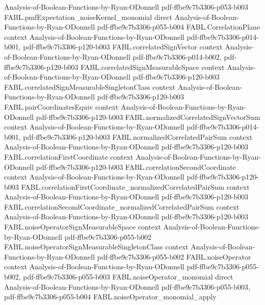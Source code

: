 \begin{theorem}
  {Analysis-of-Boolean-Functions-by-Ryan-ODonnell}
  {pdf-ffbe9c7b3306-p053-b003}
\proofstep
  {FABL.pmfExpectation_noiseKernel_monomial}
  {direct}
  {Analysis-of-Boolean-Functions-by-Ryan-ODonnell}
  {pdf-ffbe9c7b3306-p055-b004}
\proofstep
  {FABL.CorrelationPlane}
  {context}
  {Analysis-of-Boolean-Functions-by-Ryan-ODonnell}
  {pdf-ffbe9c7b3306-p014-b001,
    pdf-ffbe9c7b3306-p120-b003}
\proofstep
  {FABL.correlatedSignVector}
  {context}
  {Analysis-of-Boolean-Functions-by-Ryan-ODonnell}
  {pdf-ffbe9c7b3306-p014-b002,
    pdf-ffbe9c7b3306-p120-b003}
\proofstep
  {FABL.correlatedSignMeasurableSpace}
  {context}
  {Analysis-of-Boolean-Functions-by-Ryan-ODonnell}
  {pdf-ffbe9c7b3306-p120-b003}
\proofstep
  {FABL.correlatedSignMeasurableSingletonClass}
  {context}
  {Analysis-of-Boolean-Functions-by-Ryan-ODonnell}
  {pdf-ffbe9c7b3306-p120-b003}
\proofstep
  {FABL.pairCoordinatesEquiv}
  {context}
  {Analysis-of-Boolean-Functions-by-Ryan-ODonnell}
  {pdf-ffbe9c7b3306-p120-b003}
\proofstep
  {FABL.normalizedCorrelatedSignVectorSum}
  {context}
  {Analysis-of-Boolean-Functions-by-Ryan-ODonnell}
  {pdf-ffbe9c7b3306-p014-b001,
    pdf-ffbe9c7b3306-p120-b003}
\proofstep
  {FABL.normalizedCorrelatedPairSum}
  {context}
  {Analysis-of-Boolean-Functions-by-Ryan-ODonnell}
  {pdf-ffbe9c7b3306-p120-b003}
\proofstep
  {FABL.correlationFirstCoordinate}
  {context}
  {Analysis-of-Boolean-Functions-by-Ryan-ODonnell}
  {pdf-ffbe9c7b3306-p120-b003}
\proofstep
  {FABL.correlationSecondCoordinate}
  {context}
  {Analysis-of-Boolean-Functions-by-Ryan-ODonnell}
  {pdf-ffbe9c7b3306-p120-b003}
\proofstep
  {FABL.correlationFirstCoordinate_normalizedCorrelatedPairSum}
  {context}
  {Analysis-of-Boolean-Functions-by-Ryan-ODonnell}
  {pdf-ffbe9c7b3306-p120-b003}
\proofstep
  {FABL.correlationSecondCoordinate_normalizedCorrelatedPairSum}
  {context}
  {Analysis-of-Boolean-Functions-by-Ryan-ODonnell}
  {pdf-ffbe9c7b3306-p120-b003}
\proofstep
  {FABL.noiseOperatorSignMeasurableSpace}
  {context}
  {Analysis-of-Boolean-Functions-by-Ryan-ODonnell}
  {pdf-ffbe9c7b3306-p055-b002}
\proofstep
  {FABL.noiseOperatorSignMeasurableSingletonClass}
  {context}
  {Analysis-of-Boolean-Functions-by-Ryan-ODonnell}
  {pdf-ffbe9c7b3306-p055-b002}
\proofstep
  {FABL.noiseOperator}
  {context}
  {Analysis-of-Boolean-Functions-by-Ryan-ODonnell}
  {pdf-ffbe9c7b3306-p055-b002,
    pdf-ffbe9c7b3306-p055-b003}
\proofstep
  {FABL.noiseOperator_monomial}
  {direct}
  {Analysis-of-Boolean-Functions-by-Ryan-ODonnell}
  {pdf-ffbe9c7b3306-p055-b003,
    pdf-ffbe9c7b3306-p055-b004}
\proofstep
  {FABL.noiseOperator_monomial_apply}

\end{theorem}
